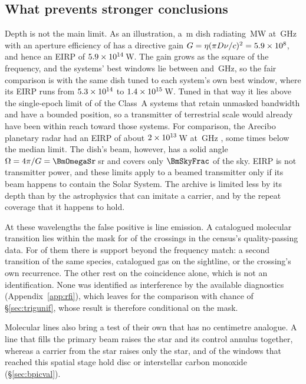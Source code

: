 \subsection{What prevents stronger conclusions}
\label{sec:mmdifferent}

Depth is not the main limit. As an illustration, a \BenchDiam\,m dish
radiating \BenchPowerMW\,MW at \BenchFreqGHz\,GHz with an aperture efficiency
of \BenchEta{} has a directive gain $G=\eta(\pi D\nu/c)^{2}=5.9\times10^{8}$, and
hence an EIRP of $5.9\times10^{14}$\,W. The gain grows as the square of the
frequency, and the systems' best windows lie between \BenchTunedFreqLo{} and
\BenchTunedFreqHi\,GHz, so the fair comparison is with the same dish tuned to
each system's own best window, where its EIRP runs from
$5.3\times10^{14}$ to $1.4\times10^{15}$\,W. Tuned in that way it lies
above the single-epoch limit of \BenchNSysTuned{} of the \NSysALimSum{}
Class~A systems that retain unmasked bandwidth and have a bounded position,
so a transmitter of terrestrial scale would already have been within reach
toward those systems. For comparison, the Arecibo planetary radar had an EIRP
of about $2\times10^{13}$\,W at \AroFreqGHz\,GHz \citep{EarthDetectingEarth2025},
some \AroMedMult{} times below the median limit. The dish's beam, however, has a solid
angle $\Omega=4\pi/G=\BmOmegaSr$\,sr and covers only $\BmSkyFrac$ of the sky.
EIRP is not transmitter power, and these limits apply to a beamed
transmitter only if its beam happens to contain the Solar System. The
archive is limited less by its depth than by the astrophysics that can
imitate a carrier, and by the repeat coverage that it happens to hold.

At these wavelengths the false positive is line emission. A
catalogued molecular transition lies within the mask for \CsNAttrQp{} of the
\CsNCrossQp{} crossings in the census's quality-passing data. For
\LnAttrSupp{} of them there is support beyond the frequency match: a second
transition of the same species, catalogued gas on the sightline, or the
crossing's own recurrence. The other \LnAttrCoincWord{} rest on the
coincidence alone, which is not an identification. None was identified as
interference by the available diagnostics (Appendix~\ref{app:rfi}), which
leaves \CsNUnattrQp{} for the comparison with chance of \S\ref{sec:trigunif},
whose result is therefore conditional on the mask.

Molecular lines also bring a test of their own that has no centimetre
analogue. A line that fills the primary beam raises the star and its control
annulus together, whereas a carrier from the star raises only the star, and
\DiscFpWin{} of the \DiscFpOfFlags{} windows that reached this spatial stage
hold disc or interstellar carbon monoxide (\S\ref{sec:bpicval}).

